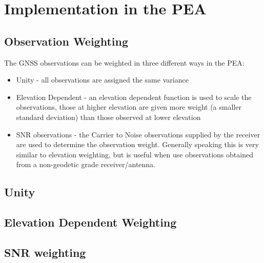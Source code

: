 \section{Implementation in the PEA}

\subsection{Observation Weighting}
%
The GNSS observations can be weighted in three different ways in the PEA:
\begin{itemize}
    \item Unity - all observations are assigned the same variance
    \item Elevation Dependent - an elevation dependent function is used to scale the observations, those at higher elevation are given more weight (a smaller standard deviation) than those observed at lower elevation
    \item SNR observations - the Carrier to Noise observations supplied by the receiver are used to determine the observation weight. Generally speaking this is very similar to elevation weighting, but is useful when use observations obtained from a non-geodetic grade receiver/antenna.
\end{itemize}
%
\subsection{Unity}

\subsection{Elevation Dependent Weighting}

\subsection{SNR weighting}




